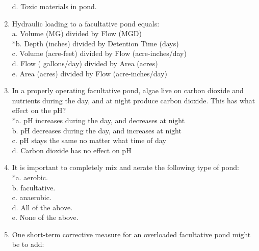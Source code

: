 \begin{enumerate}
d. Toxic materials in pond. \\


\item  Hydraulic loading to a facultative pond equals: \\


a. Volume (MG) divided by Flow (MGD) \\

*b. Depth (inches) divided by Detention Time (days) \\

c. Volume (acre-feet) divided by Flow (acre-inches/day) \\

d. Flow ( gallons/day) divided by Area (acres) \\

e. Area (acres) divided by Flow (acre-inches/day) \\


\item  In a properly operating facultative pond, algae live on carbon dioxide and nutrients during the day, and at night produce carbon dioxide. This has what effect on the pH? \\


*a. pH increases during the day, and decreases at night \\

b. pH decreases during the day, and increases at night \\

c. pH stays the same no matter what time of day \\

d. Carbon dioxide has no effect on pH \\


\item  It is important to completely mix and aerate the following type of pond: \\


*a. aerobic. \\

b. facultative. \\

c. anaerobic. \\

d. All of the above. \\

e. None of the above. \\


\item  One short-term corrective measure for an overloaded facultative pond might be to add: \\



\end{enumerate}
